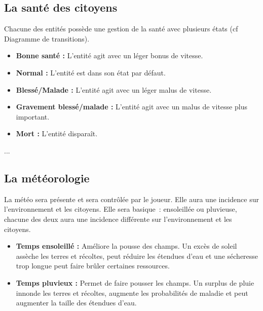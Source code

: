 \documentclass[a4paper]{article}
\begin{document}
\subsection*{La santé des citoyens}
Chacune des entités possède une gestion de la santé avec plusieurs états (cf Diagramme de transitions).
\begin{itemize}
\item \textbf{Bonne santé :} \small L'entité agit avec un léger bonus de vitesse. \normalsize
\item \textbf{Normal :} \small L'entité est dans son état par défaut. \normalsize
\item \textbf{Blessé/Malade :} \small L'entité agit avec un léger malus de vitesse. \normalsize
\item \textbf{Gravement blessé/malade :} \small L'entité agit avec un malus de vitesse plus important. \normalsize
\item \textbf{Mort :} \small L'entité disparaît. \normalsize
\end{itemize}
...

\subsection*{La météorologie}
La météo sera présente et sera contrôlée par le joueur. Elle aura une incidence sur l'environnement et les citoyens. Elle sera basique : ensoleillée ou pluvieuse, chacune des deux aura une incidence différente sur l'environnement et les citoyens. 
\begin{itemize}
\item \textbf{Temps ensoleillé :} \small Améliore la pousse des champs. Un excès de soleil assèche les terres et récoltes, peut réduire les étendues d'eau et une sécheresse trop longue peut faire brûler certaines ressources. \normalsize
\item \textbf{Temps pluvieux :} \small Permet de faire pousser les champs. Un surplus de pluie innonde les terres et récoltes, augmente les probabilités de maladie et peut augmenter la taille des étendues d'eau. \normalsize
\end{itemize}
\end{document}
